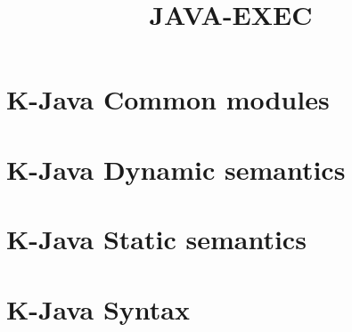 \documentclass{report}
\title{JAVA-EXEC}
\begin{document}
\chapter{K-Java Common modules}








\chapter{K-Java Dynamic semantics}




















\chapter{K-Java Static semantics}























\chapter{K-Java Syntax}













\end{document}
